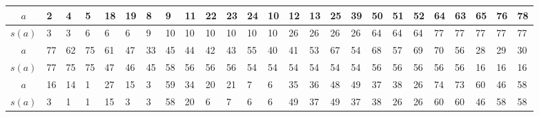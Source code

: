 \begin{center}
\begin{minipage}{\textwidth}
\renewcommand{\arraystretch}{1.3}
\begin{scriptsize}
\begin{tabular}{|c|*{24}{|p{.15cm}}|}
\hline
$a$&2&4&5&18&19&8&9&11&22&23&24&10&12&13&25&39&50&51&52&64&63&65&76&78 \\
\hline
$s(a)$&3&3&6&6&6&9&10&10&10&10&10&10&26&26&26&26&64&64&64&77&77&77&77&77\\
\hline \hline
$a$&77 &62&75&61&47&33&45&44&42&43&55&40&41&53&67&54&68&57&69&70&56&28&29&30\\
\hline
$s(a)$&77 &75&75&47&46&45&58&56&56&56&54&54&54&54&54&54&56&56&56&56&56&16&16&16\\
\hline \hline
$a$&16&14&1&27&15&3&59&34&20&21&7&6&35&36&48&49&37&38&26&74&73&60&46&58\\
\hline
$s(a)$&3&1&1&15&3&3&58&20&6&7&6&6&49&37&49&37&38&26&26&60&60&46&58&58\\
\hline
\end{tabular}
\label{Beispiel_HO_BS}
\end{scriptsize} 
\renewcommand{\arraystretch}{1}


\end{minipage}
\end{center}
